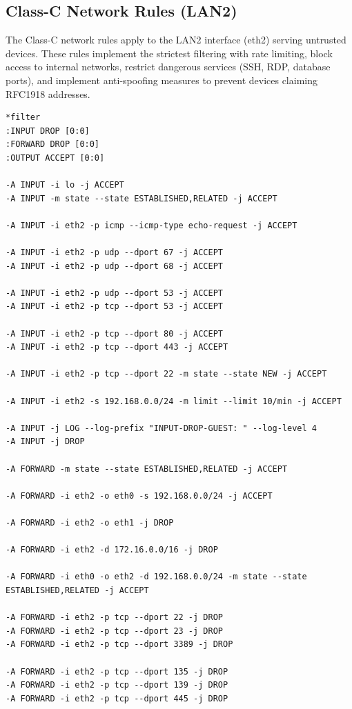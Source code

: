 \subsection{Class-C Network Rules (LAN2)}
\label{subsec:class-c-rules}

The Class-C network rules apply to the LAN2 interface (eth2) serving untrusted devices. These rules implement the strictest filtering with rate limiting, block access to internal networks, restrict dangerous services (SSH, RDP, database ports), and implement anti-spoofing measures to prevent devices claiming RFC1918 addresses.

\begin{verbatim}
*filter
:INPUT DROP [0:0]
:FORWARD DROP [0:0]
:OUTPUT ACCEPT [0:0]

-A INPUT -i lo -j ACCEPT
-A INPUT -m state --state ESTABLISHED,RELATED -j ACCEPT

-A INPUT -i eth2 -p icmp --icmp-type echo-request -j ACCEPT

-A INPUT -i eth2 -p udp --dport 67 -j ACCEPT
-A INPUT -i eth2 -p udp --dport 68 -j ACCEPT

-A INPUT -i eth2 -p udp --dport 53 -j ACCEPT
-A INPUT -i eth2 -p tcp --dport 53 -j ACCEPT

-A INPUT -i eth2 -p tcp --dport 80 -j ACCEPT
-A INPUT -i eth2 -p tcp --dport 443 -j ACCEPT

-A INPUT -i eth2 -p tcp --dport 22 -m state --state NEW -j ACCEPT

-A INPUT -i eth2 -s 192.168.0.0/24 -m limit --limit 10/min -j ACCEPT

-A INPUT -j LOG --log-prefix "INPUT-DROP-GUEST: " --log-level 4
-A INPUT -j DROP

-A FORWARD -m state --state ESTABLISHED,RELATED -j ACCEPT

-A FORWARD -i eth2 -o eth0 -s 192.168.0.0/24 -j ACCEPT

-A FORWARD -i eth2 -o eth1 -j DROP

-A FORWARD -i eth2 -d 172.16.0.0/16 -j DROP

-A FORWARD -i eth0 -o eth2 -d 192.168.0.0/24 -m state --state ESTABLISHED,RELATED -j ACCEPT

-A FORWARD -i eth2 -p tcp --dport 22 -j DROP
-A FORWARD -i eth2 -p tcp --dport 23 -j DROP
-A FORWARD -i eth2 -p tcp --dport 3389 -j DROP

-A FORWARD -i eth2 -p tcp --dport 135 -j DROP
-A FORWARD -i eth2 -p tcp --dport 139 -j DROP
-A FORWARD -i eth2 -p tcp --dport 445 -j DROP


\end{verbatim}
